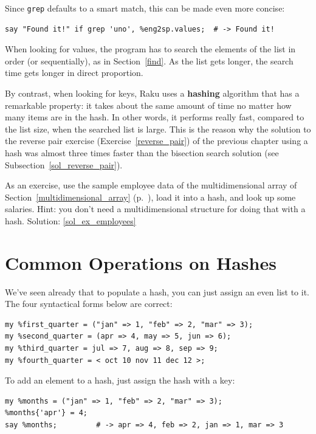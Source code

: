 Since {\tt grep} defaults to a smart match, this can be 
made even more concise:

\begin{verbatim}
say "Found it!" if grep 'uno', %eng2sp.values;  # -> Found it!
\end{verbatim}

When looking for values, the program has to search the 
elements of the list in order (or sequentially), as in 
Section~\ref{find}.  As the list gets longer, the search 
time gets longer in direct proportion.

By contrast, when looking for keys, Raku uses a {\bf hashing} 
algorithm that has a remarkable property: it takes about 
the same amount of time no matter how many items are in 
the hash. In other words, it performs really fast, compared 
to the list size, when the 
searched list is large. This is the reason why the solution to 
the reverse pair exercise (Exercise~\ref{reverse_pair}) of the 
previous chapter using a hash was almost three times 
faster than the bisection search solution 
(see Subsection~\ref{sol_reverse_pair}).

\label{ex_employees}
As an exercise, use the sample employee data of the 
multidimensional array of Section~\ref{multidimensional_array} 
(p.~\pageref{multidimensional_array}), load it into a hash, and 
look up some salaries. Hint: you don't need a 
multidimensional structure for doing that with a hash.
Solution: \ref{sol_ex_employees}


\section{Common Operations on Hashes}

We've seen already that to populate a hash, you can just 
assign an even list to it. The four syntactical forms 
below are correct:

\begin{verbatim}
my %first_quarter = ("jan" => 1, "feb" => 2, "mar" => 3);
my %second_quarter = (apr => 4, may => 5, jun => 6);
my %third_quarter = jul => 7, aug => 8, sep => 9;
my %fourth_quarter = < oct 10 nov 11 dec 12 >;
\end{verbatim}

To add an element to a hash, just assign the hash with a key:

\begin{verbatim}
my %months = ("jan" => 1, "feb" => 2, "mar" => 3);
%months{'apr'} = 4;
say %months;         # -> apr => 4, feb => 2, jan => 1, mar => 3
\end{verbatim}

